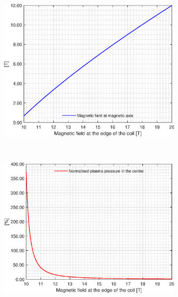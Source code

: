 \begin{figure}[H]
	\begin{subfigure}[h!]{.45\textwidth}
		\includegraphics[width=\textwidth]{MatlabFigures/Bmax/f7.eps}
	\end{subfigure}
	~
	\begin{subfigure}[h!]{.45\textwidth}
		\includegraphics[width=\textwidth]{MatlabFigures/Bmax/f8.eps}
	\end{subfigure}
\end{figure}
